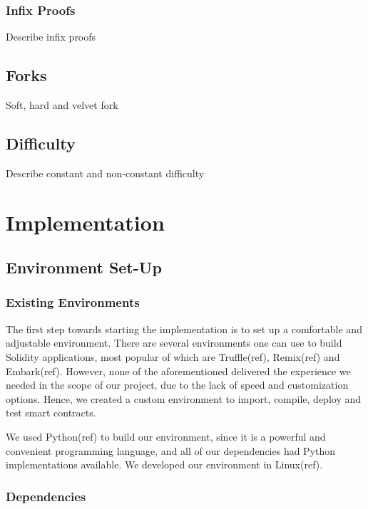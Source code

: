 \documentclass{article}
\begin{document}
  \subsubsection{Infix Proofs}

  Describe infix proofs

  \subsection{Forks}

  Soft, hard and velvet fork

  \subsection{Difficulty}

  Describe constant and non-constant difficulty

  \pagebreak

  \section{Implementation}

  \subsection{Environment Set-Up}

  \subsubsection{Existing Environments}

  The first step towards starting the implementation is to set up a
  comfortable and adjustable environment. There are several environments
  one can use to build Solidity applications, most popular of which are
  Truffle(ref), Remix(ref) and Embark(ref). However, none of the
  aforementioned delivered the experience we needed in the scope of our
  project, due to the lack of speed and customization options. Hence, we
  created a custom environment to import, compile, deploy and test smart
  contracts.

  We used Python(ref) to build our environment, since it is a powerful
  and convenient programming language, and all of our dependencies had
  Python implementations available. We developed our environment in
  Linux(ref).

  \subsubsection{Dependencies}
\end{document}
